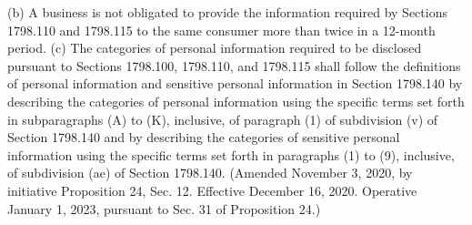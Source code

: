 (b) A business is not obligated to provide the information required by Sections 1798.110 and 1798.115 to the same consumer more than twice in a 12-month period.
(c) The categories of personal information required to be disclosed pursuant to Sections 1798.100, 1798.110, and 1798.115 shall follow the definitions of personal information and sensitive personal information in Section 1798.140 by describing the categories of personal information using the specific terms set forth in subparagraphs (A) to (K), inclusive, of paragraph (1) of subdivision (v) of Section 1798.140 and by describing the categories of sensitive personal information using the specific terms set forth in paragraphs (1) to (9), inclusive, of subdivision (ae) of Section 1798.140.
(Amended November 3, 2020, by initiative Proposition 24, Sec. 12. Effective December 16, 2020. Operative January 1, 2023, pursuant to Sec. 31 of Proposition 24.)

